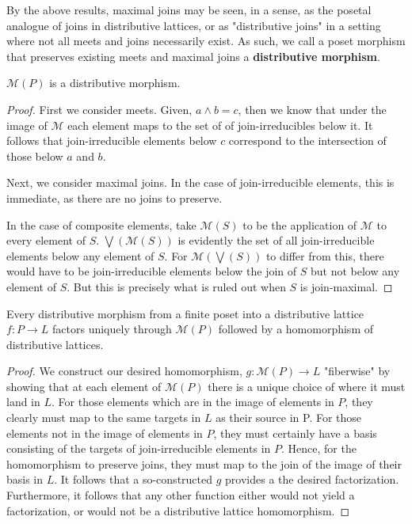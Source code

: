 \documentclass[hoptionsi,review,format=sigplan]{acmart}
\theoremstyle{definition}
\newcommand{\Mcc}{\mathcal{M}}
\begin{document}
By the above results, maximal joins may be seen, in a sense, as the posetal analogue of joins in distributive lattices, or as "distributive joins" in a setting where not all meets and joins necessarily exist. As such, we call a poset morphism that preserves existing meets and maximal joins a \textbf{distributive morphism}.

\begin{lemma}
\(\Mcc(P)\) is a distributive morphism.
\end{lemma}
\begin{proof}

First we consider meets. Given, \(a \wedge b = c\), then we know that under the image of \(\Mcc\) each element maps to the set of of join-irreducibles below it. It follows that join-irreducible elements below \(c\) correspond to the intersection of those below \(a\) and \(b\).

Next, we consider maximal joins. In the case of join-irreducible elements, this is immediate, as there are no joins to preserve.

In the case of composite elements, take \(\Mcc(S)\) to be the application of \(\Mcc\) to every element of \(S\). \(\bigvee(\Mcc(S))\) is evidently the set of all join-irreducible elements below any element of \(S\). For \(\Mcc(\bigvee(S))\) to differ from this, there would have to be join-irreducible elements below the join of \(S\) but not below any element of \(S\). But this is precisely what is ruled out when \(S\) is join-maximal.
\end{proof}




\begin{lemma}
Every distributive morphism from a finite poset into a distributive lattice \(f : P \rightarrow L\) factors uniquely through \(\Mcc(P)\) followed by a homomorphism of distributive lattices.
\end{lemma}

\begin{proof}
We construct our desired homomorphism, \(g : \Mcc(P) \rightarrow L\) "fiberwise" by showing that at each element of \(\Mcc(P)\) there is a unique choice of where it must land in \(L\). For those elements which are in the image of elements in \(P\), they clearly must map to the same targets in \(L\) as their source in P. For those elements not in the image of elements in \(P\), they must certainly have a basis consisting of the targets of join-irreducible elements in \(P\). Hence, for the homomorphism to preserve joins, they must map to the join of the image of their basis in \(L\). It follows that a so-constructed \(g\) provides a the desired factorization. Furthermore, it follows that any other function either would not yield a factorization, or would not be a distributive lattice homomorphism.
\end{proof}
\end{document}
